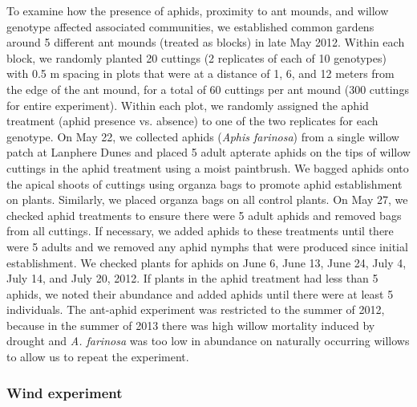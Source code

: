 \documentclass[11pt]{article}
\begin{document}
To examine how the presence of aphids, proximity to ant mounds, and
willow genotype affected associated communities, we established common
gardens around 5 different ant mounds (treated as blocks) in late May
2012. Within each block, we randomly planted 20 cuttings (2 replicates
of each of 10 genotypes) with 0.5 m spacing in plots that were at a
distance of 1, 6, and 12 meters from the edge of the ant mound, for a
total of 60 cuttings per ant mound (300 cuttings for entire experiment).
Within each plot, we randomly assigned the aphid treatment (aphid
presence vs. absence) to one of the two replicates for each genotype. On
May 22, we collected aphids (\emph{Aphis farinosa}) from a single willow
patch at Lanphere Dunes and placed 5 adult apterate aphids on the tips
of willow cuttings in the aphid treatment using a moist paintbrush. We
bagged aphids onto the apical shoots of cuttings using organza bags to
promote aphid establishment on plants. Similarly, we placed organza bags
on all control plants. On May 27, we checked aphid treatments to ensure
there were 5 adult aphids and removed bags from all cuttings. If
necessary, we added aphids to these treatments until there were 5 adults
and we removed any aphid nymphs that were produced since initial
establishment. We checked plants for aphids on June 6, June 13, June 24,
July 4, July 14, and July 20, 2012. If plants in the aphid treatment had
less than 5 aphids, we noted their abundance and added aphids
until there were at least 5 individuals. The ant-aphid experiment was
restricted to the summer of 2012, because in the summer of 2013 there
was high willow mortality induced by drought and \emph{A. farinosa} was
too low in abundance on naturally occurring willows to allow us to
repeat the experiment.

\subsubsection*{Wind experiment}
\end{document}

